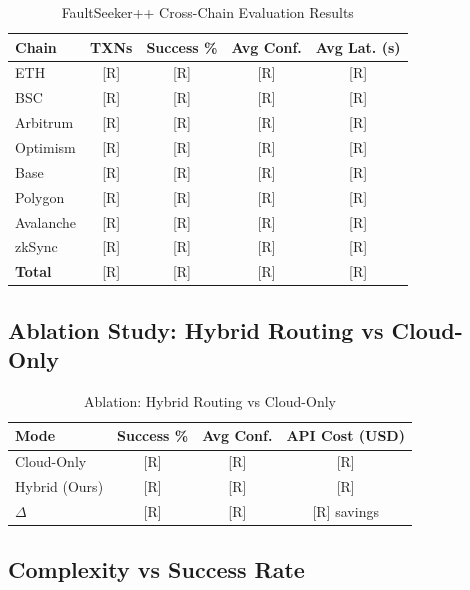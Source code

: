 \documentclass[conference]{IEEEtran}
\begin{document}
\begin{table}[h]
\centering
\caption{FaultSeeker++ Cross-Chain Evaluation Results}
\label{tab:results}
\begin{tabular}{lcccc}
\toprule
\textbf{Chain} & \textbf{TXNs} & \textbf{Success \%}
  & \textbf{Avg Conf.} & \textbf{Avg Lat. (s)} \\
\midrule
ETH       & [R] & [R] & [R] & [R] \\
BSC       & [R] & [R] & [R] & [R] \\
Arbitrum  & [R] & [R] & [R] & [R] \\
Optimism  & [R] & [R] & [R] & [R] \\
Base      & [R] & [R] & [R] & [R] \\
Polygon   & [R] & [R] & [R] & [R] \\
Avalanche & [R] & [R] & [R] & [R] \\
zkSync    & [R] & [R] & [R] & [R] \\
\midrule
\textbf{Total} & [R] & [R] & [R] & [R] \\
\bottomrule
\end{tabular}
\end{table}

\subsection{Ablation Study: Hybrid Routing vs Cloud-Only}

\begin{table}[h]
\centering
\caption{Ablation: Hybrid Routing vs Cloud-Only}
\label{tab:ablation}
\begin{tabular}{lccc}
\toprule
\textbf{Mode} & \textbf{Success \%} & \textbf{Avg Conf.} & \textbf{API Cost (USD)} \\
\midrule
Cloud-Only    & [R] & [R] & [R] \\
Hybrid (Ours) & [R] & [R] & [R] \\
\midrule
$\Delta$      & [R] & [R] & [R] savings \\
\bottomrule
\end{tabular}
\end{table}

\subsection{Complexity vs Success Rate}
\end{document}
